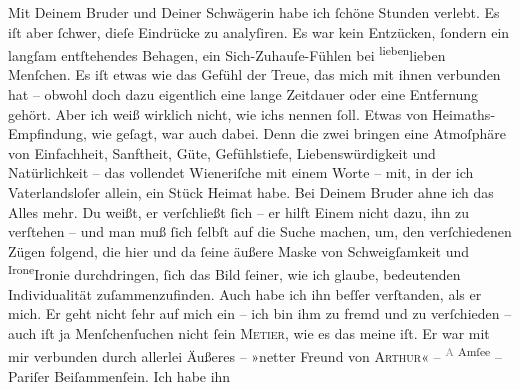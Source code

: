 \pstart
           Mit Deinem Bruder und Deiner
                  Schwägerin habe ich{ }ſchöne Stunden verlebt. Es iſt aber{ }ſchwer, dieſe Eindrücke zu analyſiren. Es war
               kein Entzücken,{ }ſondern ein langſam entſtehendes Behagen, ein Sich-Zuhauſe-Fühlen bei \substVorne{}\textsuperscript{lieben}\substDazwischen{}lieben\substHinten{} Menſchen. Es iſt etwas wie das Gefühl der Treue, das mich mit ihnen
               verbunden hat – obwohl doch dazu eigentlich eine lange Zeitdauer oder eine Entfernung
               gehört. Aber ich weiß wirklich nicht, wie ichs nennen{ }ſoll. Etwas von
               Heimaths-Empfindung, wie geſagt, {\pb}war auch dabei.
               Denn die zwei bringen eine Atmoſphäre von Einfachheit, Sanftheit, Güte, Gefühlstiefe,
               Liebenswürdigkeit und Natürlichkeit – das vollendet Wieneriſche mit einem Worte – mit, in der ich Vaterlandsloſer allein, \strikeout{\textcolor{gray}{man}} ein Stück Heimat habe. Bei Deinem Bruder ahne ich das Alles mehr. Du weißt, er verſchließt{ }ſich – er hilft Einem nicht dazu, ihn zu verſtehen – und man muß{ }ſich{ }ſelbſt auf die
               Suche machen, um, den verſchiedenen Zügen folgend, die hier und da{ }ſeine äußere Maske
               von Schweigſamkeit und \substVorne{}\textsuperscript{Irone}\substDazwischen{}Ironie\substHinten{} durchdringen,{ }ſich {\pb}das Bild{ }ſeiner, wie
               ich glaube, bedeutenden Individualität zuſammenzufinden. Auch habe ich ihn beſſer
               verſtanden, als er mich. Er geht nicht{ }ſehr auf mich ein – ich bin ihm zu fremd und
               zu verſchieden – auch iſt ja Menſchenſuchen nicht{ }ſein \textsc{Metier}, wie es das meine iſt. Er war mit mir verbunden durch allerlei
               Äußeres – »netter Freund von \textsc{Arthur}« – \substVorne{}\textsuperscript{\textcolor{gray}{A} Amſee}\substDazwischen{}\textsc{\label{K_L02608-1v}\label{K_L02608-1}}\substHinten{} – Pariſer Beiſammenſein. Ich habe ihn
